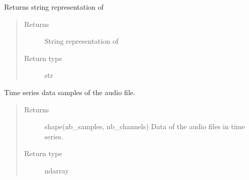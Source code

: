 \documentclass[letterpaper,10pt,english,openany,oneside]{sphinxmanual}
\begin{document}
\begin{fulllineitems}
\begin{fulllineitems}
\begin{quote}
\begin{description}
\end{description}\end{quote}

\end{fulllineitems}


\begin{fulllineitems}
\label{\detokenize{docs/source/preprocess:preprocess.track_classes.Audio.__str__}}
Returns string representation of 
\begin{quote}\begin{description}
\item[{Returns}] \leavevmode
String representation of 

\item[{Return type}] \leavevmode
str

\end{description}\end{quote}

\end{fulllineitems}


\begin{fulllineitems}
\label{\detokenize{docs/source/preprocess:preprocess.track_classes.Audio.data}}
Time series data samples of the audio file.
\begin{quote}\begin{description}
\item[{Returns}] \leavevmode
shape(nb\_samples, nb\_channels)
Data of the audio files in time series.

\item[{Return type}] \leavevmode
ndarray

\end{description}\end{quote}

\end{fulllineitems}



\end{fulllineitems}
\end{document}
